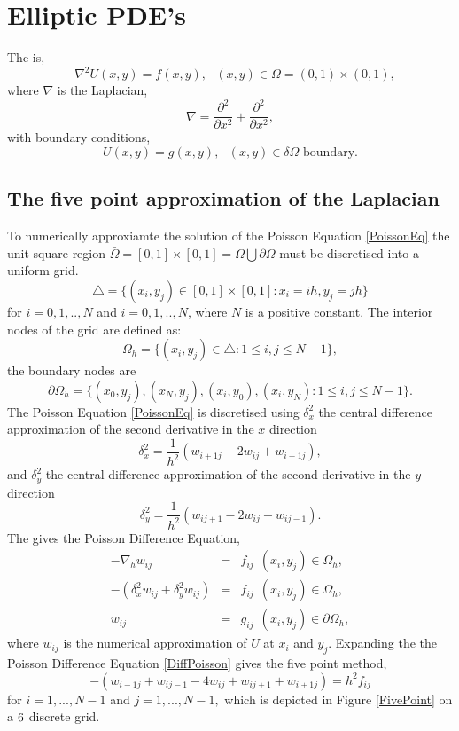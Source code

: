 \chapter{Elliptic PDE's}
The  is,
\begin{equation}
-\nabla^2U(x,y)=f(x,y), \ \ \ (x,y) \in \Omega=(0,1)\times (0,1), \label{PoissonEq} \end{equation}
where $\nabla$ is the Laplacian,
\[ \nabla = \frac{\partial^2}{\partial x^2}+\frac{\partial^2}{\partial x^2}, \]
with boundary conditions,
\[U(x,y) = g(x,y), \ \ \  (x,y)\in\delta\Omega \text{-boundary.} \]
\section{The five point approximation of the Laplacian}
To numerically approxiamte the solution of the Poisson Equation \ref{PoissonEq} the  unit square region $\bar{\Omega}=[0,1]\times[0,1]=\Omega \bigcup \partial\Omega$ must be discretised into a uniform grid.
\[ \triangle = \{(x_i,y_j)\in [0,1]\times[0,1]:x_i=ih,y_j=jh \}\]
for $i=0,1,..,N$ and $i=0,1,..,N$, where $N$ is a positive constant.
The interior nodes of the grid are defined as:
\[ \Omega_h= \{(x_i,y_j)\in \triangle:1\leq i,j\leq N-1 \},\]
the boundary nodes are
\[ \partial\Omega_h= \{(x_0,y_j),(x_{N},y_j),(x_{i},y_0),(x_{i},y_N)
:1\leq i,j\leq N-1 \}.\]
The Poisson Equation \ref{PoissonEq} is discretised using 
$\delta_x^2$ the central difference approximation of the second derivative in the $x$ direction
\[\delta_x^2=\frac{1}{h^2}(w_{i+1j}-2w_{ij}+w_{i-1j}), \]
and $\delta_y^2$ the central difference approximation of the second derivative in the $y$ direction
\[\delta_y^2=\frac{1}{h^2}(w_{ij+1}-2w_{ij}+w_{ij-1}). \]
The gives the Poisson Difference Equation,
\begin{eqnarray}
-\nabla_h w_{ij}&=&f_{ij} \ \ (x_i,y_j) \in \Omega_h, \\
-(\delta_x^2w_{ij}+\delta_y^2w_{ij})&=&f_{ij} \ \ (x_i,y_j) \in \Omega_h, \\
w_{ij}&=&g_{ij} \ \ (x_i,y_j) \in \partial\Omega_h, \label{DiffPoisson}
\end{eqnarray}
where $w_{ij}$ is the numerical approximation of $U$ at $x_i$ and $y_j$.
Expanding the  the Poisson Difference Equation \ref{DiffPoisson} gives the five point method,
\[-(w_{i-1j}+w_{ij-1}-4w_{ij}+w_{ij+1}+w_{i+1j})=h^2f_{ij} \]
for $i=1,...,N-1$ and $j=1,...,N-1,$ which is depicted in Figure \ref{FivePoint} on a $6 \time 6$ discrete grid.

